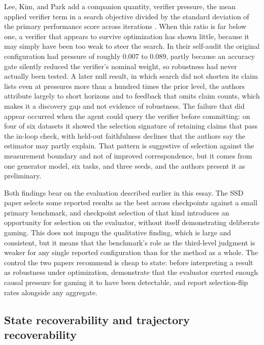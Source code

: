 \documentclass[11pt]{article}
\begin{document}
Lee, Kim, and Park add a companion quantity, verifier pressure, the mean applied verifier term in a search objective divided by the standard deviation of the primary performance score across iterations \cite{lee2026ownverifier}. When this
ratio is far below one, a verifier that appears to survive optimization
has shown little, because it may simply have been too weak to steer the
search. In their self-audit the original configuration had pressure of
roughly 0.007 to 0.089, partly because an accuracy gate silently reduced
the verifier's nominal weight, so robustness had never actually been tested. A later null result, in which search did not shorten its claim lists even at pressures more than a hundred times the prior level, the authors attribute largely to short horizons and to feedback that omits claim counts, which makes it a discovery gap and not evidence of robustness. The failure that did appear occurred when the agent could query the verifier before committing: on four of six datasets it showed the selection signature of retaining claims that pass the in-loop check, with held-out faithfulness declines that the authors say the estimator may partly explain. That pattern is suggestive of selection against the measurement boundary and not of improved correspondence, but it comes from one generator model, six tasks, and three seeds, and the authors present it as preliminary.

Both findings bear on the evaluation described earlier in this essay. The
SSD paper selects some reported results as the best across checkpoints
against a small primary benchmark, and checkpoint selection of that kind introduces an opportunity for selection on the evaluator, without itself demonstrating deliberate gaming. This does not impugn
the qualitative finding, which is large and consistent, but it means that
the benchmark's role as the third-level judgment is weaker for any single
reported configuration than for the method as a whole. The control the
two papers recommend is cheap to state: before interpreting a result as
robustness under optimization, demonstrate that the evaluator exerted
enough causal pressure for gaming it to have been detectable, and report
selection-flip rates alongside any aggregate.

\subsection{State recoverability and trajectory recoverability}
\end{document}
